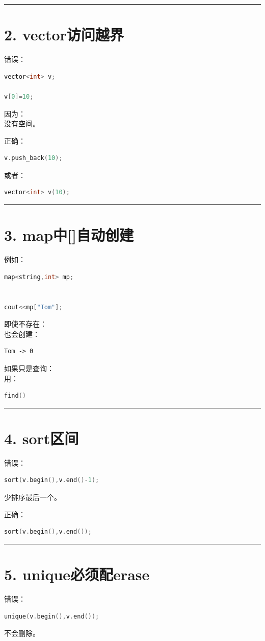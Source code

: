 \documentclass[10pt,twocolumn]{extarticle}
\begin{document}
\noindent\rule{\linewidth}{0.4pt}

\section{2. vector访问越界}
错误：
\begin{lstlisting}[language=C++]
vector<int> v;

v[0]=10;
\end{lstlisting}
因为：\\
没有空间。

正确：
\begin{lstlisting}[language=C++]
v.push_back(10);
\end{lstlisting}
或者：
\begin{lstlisting}[language=C++]
vector<int> v(10);
\end{lstlisting}

\noindent\rule{\linewidth}{0.4pt}

\section{3. map中[]自动创建}
例如：
\begin{lstlisting}[language=C++]
map<string,int> mp;


cout<<mp["Tom"];
\end{lstlisting}
即使不存在：\\
也会创建：
\begin{lstlisting}
Tom -> 0
\end{lstlisting}
如果只是查询：\\
用：
\begin{lstlisting}[language=C++]
find()
\end{lstlisting}

\noindent\rule{\linewidth}{0.4pt}

\section{4. sort区间}
错误：
\begin{lstlisting}[language=C++]
sort(v.begin(),v.end()-1);
\end{lstlisting}
少排序最后一个。

正确：
\begin{lstlisting}[language=C++]
sort(v.begin(),v.end());
\end{lstlisting}

\noindent\rule{\linewidth}{0.4pt}

\section{5. unique必须配erase}
错误：
\begin{lstlisting}[language=C++]
unique(v.begin(),v.end());
\end{lstlisting}
不会删除。
\end{document}
